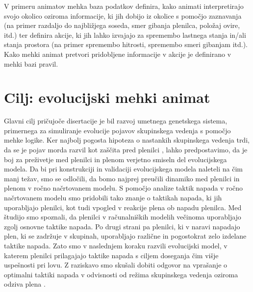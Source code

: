 \begin{razsirjeniPovzetek}
V primeru animatov mehka baza podatkov definira, kako animati interpretirajo svojo okolico oziroma informacije, ki jih dobijo iz okolice s pomočjo zaznavanja (na primer razdaljo do najbližjega soseda, smer gibanja plenilca, položaj ovire, itd.) ter definira akcije, ki jih lahko izvajajo za spremembo lastnega stanja in/ali stanja prostora (na primer spremembo hitrosti, spremembo smeri gibanjam itd.). Kako mehki animat pretvori pridobljene informacije v akcije je definirano v mehki bazi pravil.

\section{Cilj: evolucijski mehki animat}

Glavni cilj pričujoče disertacije je bil razvoj umetnega genetskega sistema, primernega za simuliranje evolucije pojavov skupinskega vedenja s pomočjo mehke logike. Ker najbolj pogosta hipoteza o nastankih skupinskega vedenja trdi, da se je pojav morda razvil kot zaščita pred plenilci \cite{cresswell2011predicting,hart2005predator,krause2002living,larsson2012why,lebarbajec2009organized,nishimura2002predator,pavlov2000patterns}, lahko predpostavimo, da je boj za preživetje med plenilci in plenom verjetno smiseln del evolucijskega modela. Da bi pri konstrukciji in validaciji evolucijskega modela naleteli na čim manj težav, smo se odločili, da bomo najprej preučili dinamiko med plenilci in plenom v ročno načrtovanem modelu. S pomočjo analize taktik napada v ročno načrtovanem modelu \cite{demsar2014simulated} smo pridobili tako znanje o taktikah napada, ki jih uporabljajo plenilci, kot tudi vpogled v reakcije plena ob napadu plenilca. Med študijo smo spoznali, da plenilci v računalniških modelih večinoma uporabljajo zgolj osnovne taktike napada. Po drugi strani pa plenilci, ki v naravi napadajo plen, ki se zadržuje v skupinah, uporabljajo različne in pogostokrat zelo izdelane taktike napada. Zato smo v naslednjem koraku razvili evolucijski model, v katerem plenilci prilagajajo taktike napada s ciljem doseganja čim višje uspešnosti pri lovu. Z raziskavo smo skušali dobiti odgovor na vprašanje o optimalni taktiki napada v odvisnosti od režima skupinskega vedenja oziroma odziva plena \cite{demsar2015simulating}.


\end{razsirjeniPovzetek}

